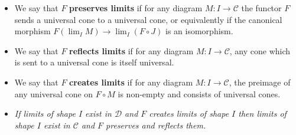 \documentclass[10pt]{article}
\newcommand{\ccat}{\mathcal{C}}
\newcommand{\dcat}{\mathcal{D}}
\begin{document}
            \begin{itemize}
                \item We say that $F$ \textbf{preserves limits} if for any diagram $M\colon I\to\ccat$ the functor $F$ sends a universal cone to a universal cone, or equivalently if the canonical morphism $F(\lim_I M)\to\lim_I(F\circ J)$ is an isomorphism.
                \item We say that $F$ \textbf{reflects limits} if for any diagram $M\colon I\to\ccat$, any cone which is sent to a universal cone is itself universal.
                \item We say that $F$ \textbf{creates limits} if for any diagram $M\colon I\to\ccat$, the preimage of any universal cone on $F\circ M$ is non-empty and consists of universal cones.
                \item \emph{If limits of shape $I$ exist in $\dcat$ and $F$ creates limits of shape $I$ then limits of shape $I$ exist in $\ccat$ and $F$ preserves and reflects them.}
            \end{itemize}
\end{document}
